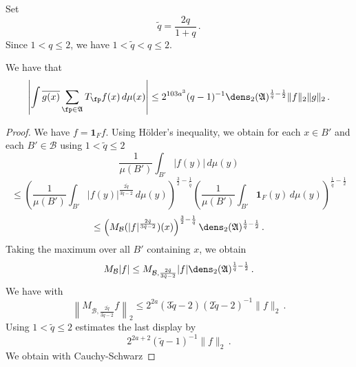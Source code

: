 Set
\begin{equation}
    \tilde{q}=\frac {2q}{1+q}\,.
\end{equation}
Since $1< q\le 2$, we have $1<\tilde{q}<q\le 2$.
\begin{lemma}
\label{dens2-antichain}
\leanok
{}
We have that
\begin{equation}\label{eqttt9}
  \left|\int \overline{g(x)} \sum_{\fp \in \mathfrak{A}} T_{\fp} f(x)\, d\mu(x)\right|\le
  2^{103a^3}({q}-1)^{-1} \dens_2(\mathfrak{A})^{\frac 1{\tilde{q}}-\frac 12} \|f\|_2\|g\|_2\, .
\end{equation}
\end{lemma}
\begin{proof}
\leanok
We have $f=\mathbf{1}_Ff$. Using H\"older's inequality, we obtain for
each $x\in B'$ and each $B'\in \mathcal{B}$ using $1<\tilde{q}\le 2$
\begin{equation}
    \frac 1{\mu(B')}\int_{B'} |f(y)|\, d\mu(y)
\end{equation}
\begin{equation}
    \le
    \left(\frac 1{\mu(B')}\int_{B'} |f(y)|^{\frac {2{\tilde{q}}}{3\tilde{q}-2}}\, d\mu(y)\right)^{\frac 32-\frac 1{\tilde{q}}}
    \left(\frac 1{\mu(B')}\int_{B'} \mathbf{1}_F(y)\, d\mu(y)\right)^{\frac 1{\tilde{q}}-\frac 12}
\end{equation}
\begin{equation}
    \le \left(M_{\mathcal{B}} (|f|^{\frac {2{\tilde{q}}}{3{\tilde{q}}-2}})(x)\right)^{\frac 32-\frac 1{\tilde{q}}}
\dens_2(\mathfrak{A})^{\frac 1{\tilde{q}}-\frac 12}\, .
\end{equation}
Taking the maximum over all $B'$ containing $x$, we obtain
\begin{equation} \label{eqttt1}
    M_{\mathcal{B}}|f|\le
    M_{\mathcal{B},\frac {2{\tilde{q}}}{3{\tilde{q}}-2} } |f|
    \dens_2(\mathfrak{A})^{\frac 1{\tilde{q}}-\frac 12}\, .
\end{equation}
We have with 
\begin{equation}
\left\|M_{\mathcal{B}, \frac {2{\tilde{q}}}{3{\tilde{q}}-2}} f\right\|_2\le 2^{2a}(3\tilde{q}-2)(2\tilde{q}-2)^{-1}\|f\|_2\, .
\end{equation}
Using $1<\tilde{q}\le 2$ estimates the last display by
\begin{equation}\label{eqttt2}
 2^{2a+2} (\tilde{q}-1)^{-1} \|f\|_2\, .
\end{equation}
We obtain with Cauchy-Schwarz

\end{proof}
